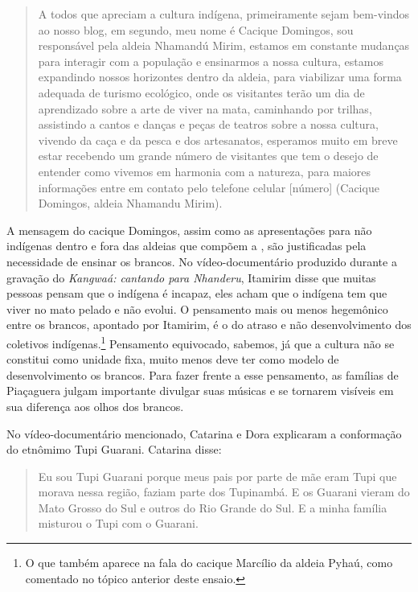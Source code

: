 {{\begin{quotation}
A todos que apreciam a cultura indígena, primeiramente sejam bem-vindos ao
nosso blog, em segundo, meu nome é Cacique Domingos, sou responsável
pela aldeia Nhamandú Mirim, estamos em constante mudanças para
interagir com a população e ensinarmos a nossa cultura, estamos
expandindo nossos horizontes dentro da aldeia, para viabilizar uma
forma adequada de turismo ecológico, onde os visitantes terão um dia de
aprendizado sobre a arte de viver na mata, caminhando por trilhas,
assistindo a cantos e danças e peças de teatros sobre a nossa cultura,
vivendo da caça e da pesca e dos artesanatos, esperamos muito em breve
estar recebendo um grande número de visitantes que tem o desejo de
entender como vivemos em harmonia com a natureza, para maiores
informações entre em contato pelo telefone celular [número] (Cacique
Domingos, aldeia Nhamandu Mirim).
\end{quotation}

A mensagem do cacique Domingos, assim como as apresentações para não
indígenas dentro e fora das aldeias que compõem a , são justificadas
pela necessidade de ensinar os brancos. No vídeo-documentário produzido
durante a gravação do  \emph{Kangwaá: cantando para Nhanderu}, Itamirim
disse que muitas pessoas pensam que o indígena é incapaz, eles acham
que o indígena tem que viver no mato pelado e não evolui. O pensamento
mais ou menos hegemônico entre os brancos, apontado por Itamirim, é o
do atraso e não desenvolvimento dos coletivos indígenas.\footnote{O que
também aparece na fala do cacique Marcílio da aldeia Pyhaú, como
comentado no tópico anterior deste ensaio.} Pensamento equivocado,
sabemos, já que a cultura não se constitui como unidade fixa, muito
menos deve ter como modelo de desenvolvimento os brancos. Para fazer
frente a esse pensamento, as famílias de Piaçaguera julgam importante
divulgar suas músicas e se tornarem visíveis em sua diferença aos olhos
dos brancos.

No vídeo-documentário mencionado, Catarina e Dora explicaram a
conformação do etnômimo Tupi Guarani. Catarina disse: 

\begin{quotation}
Eu sou Tupi Guarani porque meus pais por parte de mãe eram Tupi que
morava nessa região, faziam parte dos Tupinambá. E os Guarani vieram do
Mato Grosso do Sul e outros do Rio Grande do Sul. E a minha família
misturou o Tupi com o Guarani.
\end{quotation}

}}
